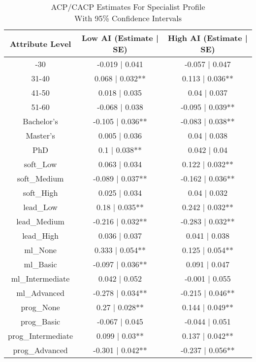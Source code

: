 \begin{table}[t]
\caption*{
{\large ACP/CACP Estimates For Specialist Profile} \\ 
{\small With 95\% Confidence Intervals}
} 
\fontsize{12.0pt}{14.4pt}\selectfont
\begin{tabular*}{\linewidth}{@{\extracolsep{\fill}}ccc}
\toprule
Attribute Level & Low AI (Estimate | SE) & High AI (Estimate | SE) \\ 
\midrule\addlinespace[2.5pt]
21-30 & -0.019 | 0.041 & -0.057 | 0.047 \\ 
31-40 & 0.068 | 0.032** & 0.113 | 0.036** \\ 
41-50 & 0.018 | 0.035 & 0.04 | 0.037 \\ 
51-60 & -0.068 | 0.038 & -0.095 | 0.039** \\ 
Bachelor's & -0.105 | 0.036** & -0.083 | 0.038** \\ 
Master's & 0.005 | 0.036 & 0.04 | 0.038 \\ 
PhD & 0.1 | 0.038** & 0.042 | 0.04 \\ 
soft\_Low & 0.063 | 0.034 & 0.122 | 0.032** \\ 
soft\_Medium & -0.089 | 0.037** & -0.162 | 0.036** \\ 
soft\_High & 0.025 | 0.034 & 0.04 | 0.032 \\ 
lead\_Low & 0.18 | 0.035** & 0.242 | 0.032** \\ 
lead\_Medium & -0.216 | 0.032** & -0.283 | 0.032** \\ 
lead\_High & 0.036 | 0.037 & 0.041 | 0.038 \\ 
ml\_None & 0.333 | 0.054** & 0.125 | 0.054** \\ 
ml\_Basic & -0.097 | 0.036** & 0.091 | 0.047 \\ 
ml\_Intermediate & 0.042 | 0.052 & -0.001 | 0.055 \\ 
ml\_Advanced & -0.278 | 0.034** & -0.215 | 0.046** \\ 
prog\_None & 0.27 | 0.028** & 0.144 | 0.049** \\ 
prog\_Basic & -0.067 | 0.045 & -0.044 | 0.051 \\ 
prog\_Intermediate & 0.099 | 0.03** & 0.137 | 0.042** \\ 
prog\_Advanced & -0.301 | 0.042** & -0.237 | 0.056** \\ 
\bottomrule
\end{tabular*}
\end{table}

